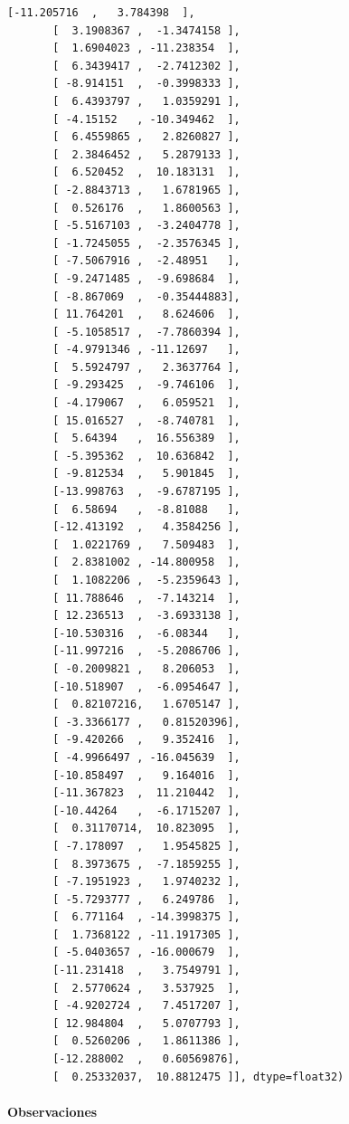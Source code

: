 \documentclass[11pt]{article}
\begin{document}
\begin{tcolorbox}[breakable, size=fbox, boxrule=.5pt, pad at break*=1mm, opacityfill=0]
\begin{Verbatim}[commandchars=\\\{\}]
       [-11.205716  ,   3.784398  ],
       [  3.1908367 ,  -1.3474158 ],
       [  1.6904023 , -11.238354  ],
       [  6.3439417 ,  -2.7412302 ],
       [ -8.914151  ,  -0.3998333 ],
       [  6.4393797 ,   1.0359291 ],
       [ -4.15152   , -10.349462  ],
       [  6.4559865 ,   2.8260827 ],
       [  2.3846452 ,   5.2879133 ],
       [  6.520452  ,  10.183131  ],
       [ -2.8843713 ,   1.6781965 ],
       [  0.526176  ,   1.8600563 ],
       [ -5.5167103 ,  -3.2404778 ],
       [ -1.7245055 ,  -2.3576345 ],
       [ -7.5067916 ,  -2.48951   ],
       [ -9.2471485 ,  -9.698684  ],
       [ -8.867069  ,  -0.35444883],
       [ 11.764201  ,   8.624606  ],
       [ -5.1058517 ,  -7.7860394 ],
       [ -4.9791346 , -11.12697   ],
       [  5.5924797 ,   2.3637764 ],
       [ -9.293425  ,  -9.746106  ],
       [ -4.179067  ,   6.059521  ],
       [ 15.016527  ,  -8.740781  ],
       [  5.64394   ,  16.556389  ],
       [ -5.395362  ,  10.636842  ],
       [ -9.812534  ,   5.901845  ],
       [-13.998763  ,  -9.6787195 ],
       [  6.58694   ,  -8.81088   ],
       [-12.413192  ,   4.3584256 ],
       [  1.0221769 ,   7.509483  ],
       [  2.8381002 , -14.800958  ],
       [  1.1082206 ,  -5.2359643 ],
       [ 11.788646  ,  -7.143214  ],
       [ 12.236513  ,  -3.6933138 ],
       [-10.530316  ,  -6.08344   ],
       [-11.997216  ,  -5.2086706 ],
       [ -0.2009821 ,   8.206053  ],
       [-10.518907  ,  -6.0954647 ],
       [  0.82107216,   1.6705147 ],
       [ -3.3366177 ,   0.81520396],
       [ -9.420266  ,   9.352416  ],
       [ -4.9966497 , -16.045639  ],
       [-10.858497  ,   9.164016  ],
       [-11.367823  ,  11.210442  ],
       [-10.44264   ,  -6.1715207 ],
       [  0.31170714,  10.823095  ],
       [ -7.178097  ,   1.9545825 ],
       [  8.3973675 ,  -7.1859255 ],
       [ -7.1951923 ,   1.9740232 ],
       [ -5.7293777 ,   6.249786  ],
       [  6.771164  , -14.3998375 ],
       [  1.7368122 , -11.1917305 ],
       [ -5.0403657 , -16.000679  ],
       [-11.231418  ,   3.7549791 ],
       [  2.5770624 ,   3.537925  ],
       [ -4.9202724 ,   7.4517207 ],
       [ 12.984804  ,   5.0707793 ],
       [  0.5260206 ,   1.8611386 ],
       [-12.288002  ,   0.60569876],
       [  0.25332037,  10.8812475 ]], dtype=float32)
\end{Verbatim}
\end{tcolorbox}
        
    \paragraph{Observaciones}\label{observaciones}
\end{document}
